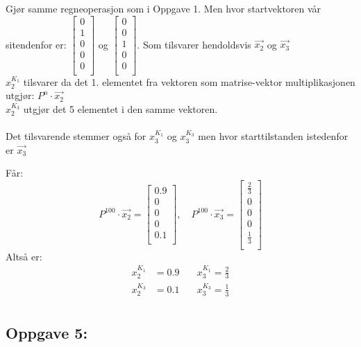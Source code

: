 \documentclass[a4paper, norsk, twoside, 10pt]{article}
\begin{document}
\begin{flushleft}
  Gjør samme regneoperasjon som i Oppgave 1. Men hvor startvektoren vår sitendenfor er:
  $\begin{bmatrix}
    0 \\
    1 \\
    0 \\
    0 \\
    0 \\
  \end{bmatrix}$
  og
    $\begin{bmatrix}
    0 \\
    0 \\
    1 \\
    0 \\
    0 \\
    \end{bmatrix}$.
  Som tilsvarer hendoldsvis $\vec{x_{2}}$ og $\vec{x_{3}}$\\
  $x_{2}^{K_{1}}$ tilsvarer da det 1. elementet fra vektoren som matrise-vektor multiplikasjonen utgjør: $P^{n}\cdot \vec{x_{2}}$ \\$x_{2}^{K_{3}}$ utgjør det 5 elementet i den samme vektoren. \\ \ \\
  Det tilsvarende stemmer også for $x_{3}^{K_{1}}$ og $x_{3}^{K_{3}}$ men hvor starttilstanden istedenfor er $\vec{x_{3}}$

  Får:
  \[ P^{100}\cdot \vec{x_{2}} = \begin{bmatrix}
    0.9 \\
    0 \\
    0 \\
    0 \\
    0.1 \\
  \end{bmatrix}, \quad
  P^{100}\cdot \vec{x_{3}} = \begin{bmatrix}
    \frac{2}{3} \\
    0 \\
    0 \\
    0 \\
    \frac{1}{3} \\
  \end{bmatrix}
  \]
  Altså er:
  \begin{align*} x_{2}^{K_{1}} &= 0.9 \quad &x_{3}^{K_{1}} = \frac{2}{3} \\
    x_{2}^{K_{3}} &= 0.1 \quad &x_{3}^{K_{3}} = \frac{1}{3} \\
  \end{align*}


  \subsection*{Oppgave 5:}


\end{flushleft}
\end{document}
